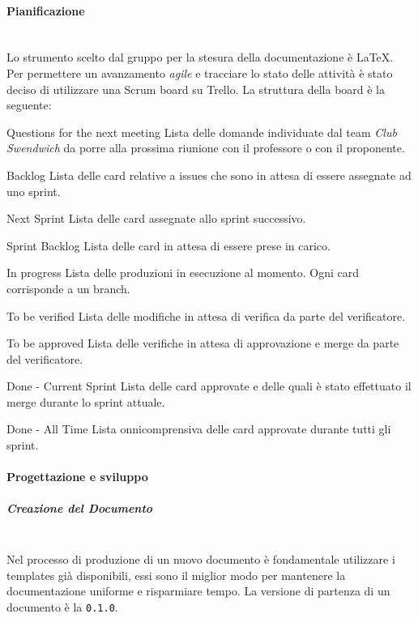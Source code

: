 \paragraph{Pianificazione}
\mbox{}\\
Lo strumento scelto dal gruppo per la stesura della documentazione è \LaTeX.\\
Per permettere un avanzamento \textit{agile} e tracciare lo stato delle attività è stato deciso di utilizzare una Scrum board su Trello.
La struttura della board è la seguente:
\begin{itemdescript}
    \item [Questions for the next meeting] Lista delle domande individuate dal team \textit{Club Swendwich} da porre alla prossima riunione con il professore o con il proponente.
    \item [Backlog] Lista delle card relative a issues che sono in attesa di essere assegnate ad uno sprint.
    \item [Next Sprint] Lista delle card assegnate allo sprint successivo. 
    \item [Sprint Backlog] Lista delle card in attesa di essere prese in carico.
    \item [In progress] Lista delle produzioni in esecuzione al momento. Ogni card corrisponde a un branch.
    \item [To be verified] Lista delle modifiche in attesa di verifica da parte del verificatore.
    \item [To be approved] Lista delle verifiche in attesa di approvazione e merge da parte del verificatore.
    \item [Done - Current Sprint] Lista delle card approvate e delle quali è stato effettuato il merge durante lo sprint attuale.
    \item [Done - All Time] Lista onnicomprensiva delle card approvate durante tutti gli sprint.
\end{itemdescript}


\paragraph{Progettazione e sviluppo}
\subparagraph{Creazione del Documento}
\mbox{}\\
Nel processo di produzione di un nuovo documento è fondamentale utilizzare i templates già
disponibili, essi sono il miglior modo per mantenere la documentazione uniforme e
risparmiare tempo.
La versione di partenza di un documento è la \texttt{0.1.0}.

